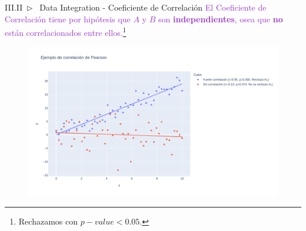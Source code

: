 \documentclass[xcolor=dvipsnames]{beamer}
\begin{document}
    \begin{frame}{III.II~$\rhd$~ Data Integration - Coeficiente de Correlación}
        \scriptsize{\textcolor{DarkOrchid}{El Coeficiente de Correlación tiene por hipótesis que $A$ y $B$ son \textbf{independientes}, osea que \textbf{no} están correlacionados entre ellos.}}\footnote{\scriptsize{Rechazamos con $p-value<0.05$.}}
        \vspace{3mm}
        \begin{figure}
            \centering
            \includegraphics[width=0.9\linewidth]{imgs/corr/ej1.png}
        \end{figure}
    \end{frame}
\end{document}
